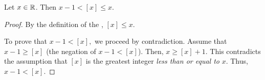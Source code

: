 \documentclass{ximera}
\begin{document}
\begin{lem*}\label{lem:floor-inter}
 Let $x\in\mathbb R$. Then $x-1<[x]\leq x$.
\end{lem*}
\begin{proof}
By the definition of the , $[x]\leq x$. 

To prove that $x-1<[x],$ we proceed by contradiction. Assume that $x-1\geq [x]$ (the negation of $x-1<[x]$). Then, $x\geq [x]+1$. This contradicts the assumption that $[x]$ is the greatest integer \emph{less than or equal to} $x$. Thus, $x-1<[x].$
\end{proof}


%
%
\end{document}
